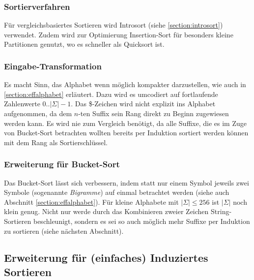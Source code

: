 \subsubsection{Sortierverfahren}

Für vergleichsbasiertes Sortieren wird Introsort (siehe \ref{section:introsort}) verwendet. Zudem wird zur Optimierung Insertion-Sort für besonders kleine Partitionen genutzt, wo es schneller als Quicksort ist.\\

\subsubsection{Eingabe-Transformation}

Es macht Sinn, das Alphabet wenn möglich kompakter darzustellen, wie auch in \ref{section:effalphabet} erläutert. Dazu wird es umcodiert auf fortlaufende Zahlenwerte 0..$|\Sigma|-1$. Das \$-Zeichen wird nicht explizit ins Alphabet aufgenommen, da dem $n$-ten Suffix sein Rang direkt zu Beginn zugewiesen werden kann. Es wird nie zum Vergleich benötigt, da alle Suffixe, die es im Zuge von Bucket-Sort betrachten wollten bereits per Induktion sortiert werden können mit dem Rang als Sortierschlüssel.

\subsubsection{Erweiterung für Bucket-Sort}

Das Bucket-Sort lässt sich verbessern, indem statt nur einem Symbol jeweils zwei Symbole (sogenannte \textit{Bigramme}) auf einmal betrachtet werden (siehe auch Abschnitt \ref{section:effalphabet}). Für kleine Alphabete mit $|\Sigma| \leq 256$ ist $|\Sigma|$ noch klein genug. Nicht nur werde durch das Kombinieren zweier Zeichen String-Sortieren beschleunigt, sondern es sei so auch möglich mehr Suffixe per Induktion zu sortieren (siehe nächsten Abschnitt).

\subsection{Erweiterung für (einfaches) Induziertes Sortieren}

